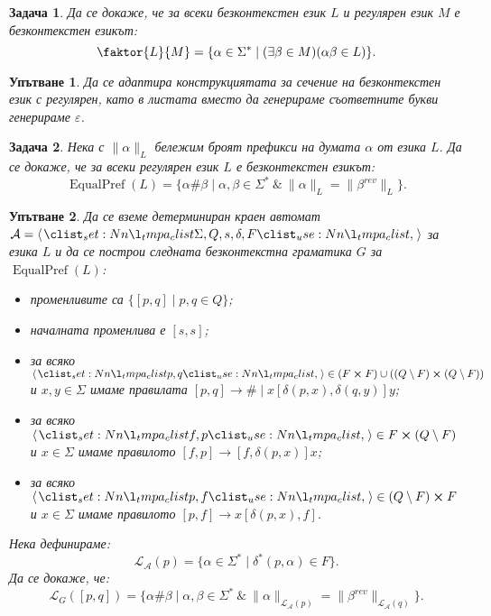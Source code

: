 \documentclass[12pt]{article}
\newtheorem{problem}{Задача}[section]
\newtheorem*{hint}{Упътване}
\theoremstyle{definition}
\begin{document}
\begin{problem}
Да се докаже, че за всеки безконтекстен език $L$ и регулярен език $M$ е безконтекстен езикът:
\[
    \faktor{L}{M} = \{ \alpha \in \Sigma^* \mid (\exists \beta \in M) (\alpha \beta \in L) \}.
\]
\end{problem}

\begin{hint}
    Да се адаптира конструкциятата за сечение на безконтекстен език с регулярен, като в листата вместо да генерираме съответните букви генерираме $\varepsilon$.
\end{hint}

\begin{problem}
Нека с $\|\alpha\|_L$ бележим броят префикси на думата $\alpha$ от езика $L$.
Да се докаже, че за всеки регулярен език $L$ е безконтекстен езикът:
\[
    \operatorname{EqualPref}(L) = \{ \alpha \# \beta \mid \alpha, \beta \in \Sigma^* \: \& \: \|\alpha\|_L = \|\beta^{rev}\|_L \}.
\]
\end{problem}

\begin{hint}
    Да се вземе детерминиран краен автомат $\mathcal{A} = \opair{\Sigma, Q, s, \delta, F}$ за езика $L$ и да се построи следната безконтекстна граматика $G$ за $\operatorname{EqualPref}(L)$:
    \begin{itemize}
        \item променливите са $\{ \left[ p, q \right] \mid p, q \in Q \}$;
        \item началната променлива е $\left[ s, s \right]$;
        \item за всяко $\opair{p, q} \in (F \cross F) \cup ((Q \setminus F) \cross (Q \setminus F))$ и $x, y \in \Sigma$ имаме правилата $\left[ p, q \right] \rightarrow \# \mid x \left[ \delta(p, x), \delta(q, y) \right] y$;
        \item за всяко $\opair{f, p} \in F \cross (Q \setminus F)$ и $x \in \Sigma$ имаме правилото $\left[ f, p \right] \rightarrow  \left[ f, \delta(p, x) \right] x$;
        \item за всяко $\opair{p, f} \in (Q \setminus F) \cross F$ и $x \in \Sigma$ имаме правилото $\left[ p, f \right] \rightarrow  x \left[ \delta(p, x), f \right]$.
    \end{itemize}
    Нека дефинираме:
    \[
        \mathcal{L_A}(p) = \{ \alpha \in \Sigma^* \mid \delta^*(p, \alpha) \in F \}.
    \]
    Да се докаже, че:
    \[
        \mathcal{L}_G( \left[ p, q \right] ) = \{ \alpha \# \beta \mid \alpha, \beta \in \Sigma^* \: \& \: \|\alpha\|_{\mathcal{L_A}(p)} = \|\beta^{rev}\|_{\mathcal{L_A}(q)} \}.
    \]
\end{hint}
\end{document}
